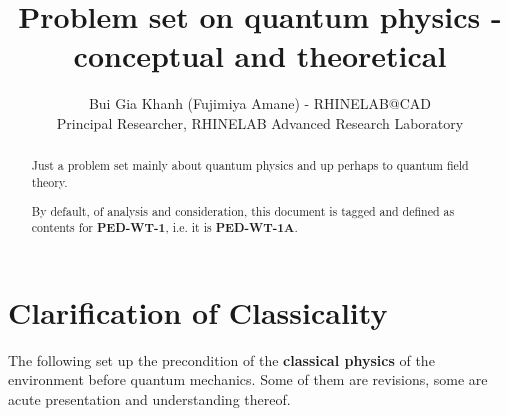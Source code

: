 \documentclass[10pt]{article}
\title{Problem set on quantum physics - conceptual and theoretical}
\author{
  Bui Gia Khanh (Fujimiya Amane) - RHINELAB@CAD \\
  {\small Principal Researcher, RHINELAB Advanced Research Laboratory}
}
\date{}
\begin{document}
\maketitle

\begin{abstract}
Just a problem set mainly about quantum physics and up perhaps to quantum field theory. 

By default, of analysis and consideration, this document is tagged and defined as contents for \textbf{PED-WT-1}, i.e. it is \textbf{PED-WT-1A}. 
\end{abstract}



\clearpage

\section{Clarification of Classicality}\label{sec:ClassicalProb}

The following set up the precondition of the \textbf{classical physics} of the environment before quantum mechanics. Some of them are revisions, some are acute presentation and understanding thereof. 
\end{document}
